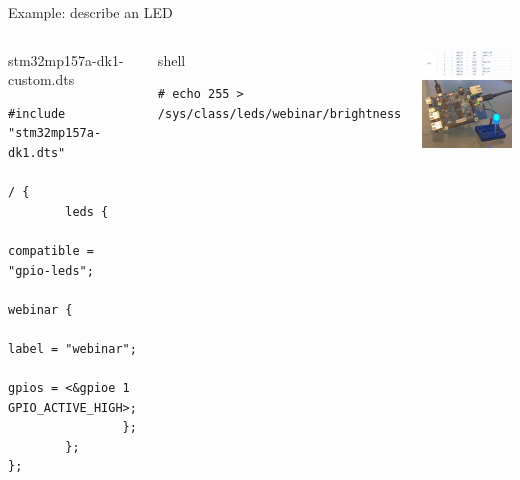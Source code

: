 \begin{frame}[fragile]{Example: describe an LED}
  \begin{columns}
  \begin{block}{stm32mp157a-dk1-custom.dts}
    {\tiny
\begin{verbatim}
#include "stm32mp157a-dk1.dts"

/ {
        leds {
                compatible = "gpio-leds";
                webinar {
                        label = "webinar";
                        gpios = <&gpioe 1 GPIO_ACTIVE_HIGH>;
                };
        };
};
\end{verbatim}
      }
  \end{block}
  \begin{block}{shell}
{\tiny
\begin{verbatim}
# echo 255 > /sys/class/leds/webinar/brightness
\end{verbatim}
}
\end{block}
  \begin{center}
    \includegraphics[height=0.3\textheight]{slides/sysdev-hw-devices/cn14-pinout.png}\\
    \vspace{0.5cm}
    \includegraphics[height=0.3\textheight]{slides/sysdev-hw-devices/led-on.jpg}
  \end{center}
  \end{columns}
\end{frame}


